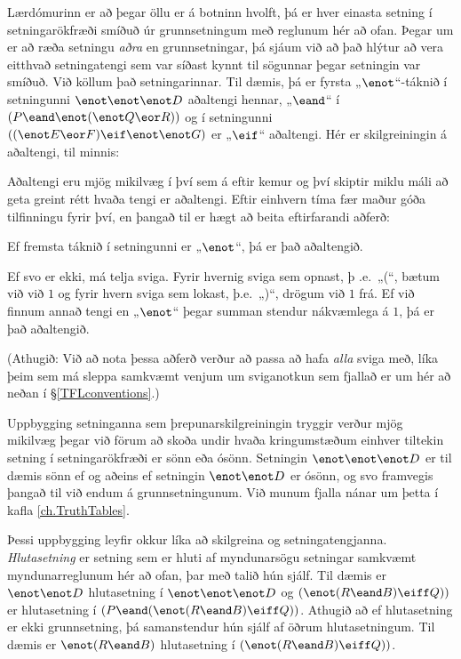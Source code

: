 Lærdómurinn er að þegar öllu er á botninn hvolft, þá er hver einasta setning í setningarökfræði smíðuð úr grunnsetningum með reglunum hér að ofan. Þegar um er að ræða setningu \emph{aðra} en grunnsetningar, þá sjáum við að það hlýtur að vera eitthvað setningatengi sem var síðast kynnt til sögunnar þegar setningin var smíðuð. Við köllum það  setningarinnar. Til dæmis, þá er fyrsta „$\enot$“-táknið í setningunni $\enot\enot\enot D$ aðaltengi hennar, „$\eand$“ í $(P \eand \enot (\enot Q \eor R))$ og í setningunni $((\enot E \eor F) \eif \enot\enot G)$ er „$\eif$“ aðaltengi. Hér er skilgreiningin á aðaltengi, til minnis:


Aðaltengi eru mjög mikilvæg í því sem á eftir kemur og því skiptir miklu máli að geta greint rétt hvaða tengi er aðaltengi. Eftir einhvern tíma fær maður góða tilfinningu fyrir því, en þangað til er hægt að beita eftirfarandi aðferð:

\begin{ebullet}
	\item Ef fremsta táknið í setningunni er „$\enot$“, þá er það aðaltengið.
	\item Ef svo er ekki, má telja sviga. Fyrir hvernig sviga sem opnast, þ .e.\ „(“, bætum við við $1$ og fyrir hvern sviga sem lokast, þ.e.\ „)“, drögum við $1$ frá. Ef við finnum annað tengi en „$\enot$“ þegar summan stendur nákvæmlega á $1$, þá er það aðaltengið.
	\end{ebullet}
(Athugið: Við að nota þessa aðferð verður að passa að hafa \emph{alla} sviga með, líka þeim sem má sleppa samkvæmt venjum um sviganotkun sem fjallað er um hér að neðan í \S\ref{TFLconventions}.)

Uppbygging setninganna sem þrepunarskilgreiningin tryggir verður mjög mikilvæg þegar við förum að skoða undir hvaða kringumstæðum einhver tiltekin setning í setningarökfræði er sönn eða ósönn. Setningin $\enot \enot \enot D$ er til dæmis sönn ef og aðeins ef setningin $\enot \enot D$ er ósönn, og svo framvegis þangað til við endum á grunnsetningunum. Við munum fjalla nánar um þetta í kafla \ref{ch.TruthTables}.

Þessi uppbygging leyfir okkur líka að skilgreina  og  setningatengjanna. \emph{Hlutasetning} er setning sem er hluti af myndunarsögu setningar samkvæmt myndunarreglunum hér að ofan, þar með talið hún sjálf. Til dæmis er $\enot \enot D$ hlutasetning í $\enot \enot \enot D$ og $(\enot (R \eand B) \eiff Q))$ er hlutasetning í $(P \eand (\enot (R \eand B) \eiff Q))$. Athugið að ef hlutasetning er ekki grunnsetning, þá samanstendur hún sjálf af öðrum hlutasetningum. Til dæmis er $\enot (R \eand B)$ hlutasetning í $(\enot (R \eand B) \eiff Q))$. 

